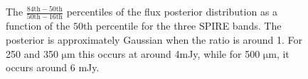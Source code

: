 \documentclass[useAMS,usenatbib]{mnras}
\begin{document}
\begin{figure}
\centering 
{}
\caption{The $\frac{\mathrm{84th}-\mathrm{50th}}{\mathrm{50th-16th}}$ percentiles of the flux posterior distribution as a function of the $\mathrm{50th}$ percentile for the three SPIRE bands. The posterior is approximately Gaussian when the ratio is around 1. For 250 and 350 $\mathrm{\mu m}$ this occurs at around 4mJy, while for 500 $\mathrm{\mu m}$, it occurs around 6 mJy.}\label{fig:detections}
\end{figure}
\end{document}
